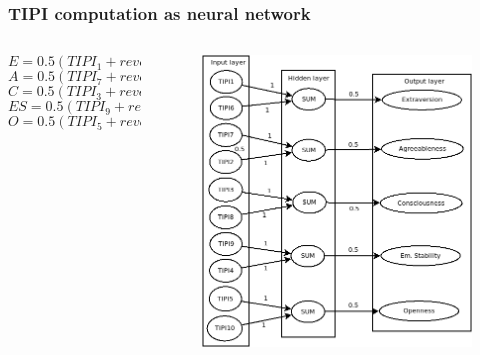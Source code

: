\documentclass[11pt,xcolor=x11names,compress]{beamer}
\renewcommand{\(}{\begin{columns}}
\renewcommand{\)}{\end{columns}}
\newcommand{\<}[1]{\begin{column}{#1}}
\renewcommand{\>}{\end{column}}
\begin{document}
\begin{frame}
	\frametitle{TIPI computation as neural network}
	\begin{columns}
	\begin{column}{0.5\textwidth}
	\scriptsize
	\begin{equation}
		E = 0.5 (TIPI_1 + reverse(TIPI_6))
	\end{equation}
	\begin{equation}
		A = 0.5 (TIPI_7 + reverse(TIPI_2))
	\end{equation}
	\begin{equation}
		C = 0.5 (TIPI_3 + reverse(TIPI_8))
	\end{equation}
	\begin{equation}
		ES = 0.5 (TIPI_9 + reverse(TIPI_4)) 
	\end{equation}
	\begin{equation}
		\label{tipi-o}
		O = 0.5 (TIPI_5 + reverse(TIPI_{10})) 
	\end{equation}
	\end{column}
	\begin{column}{0.5\textwidth}
	\begin{figure}
		\centering
		\includegraphics[width=\textwidth]{TIPIasNN.png}
	\end{figure}
	\end{column}
	\end{columns}
\end{frame}
\end{document}
